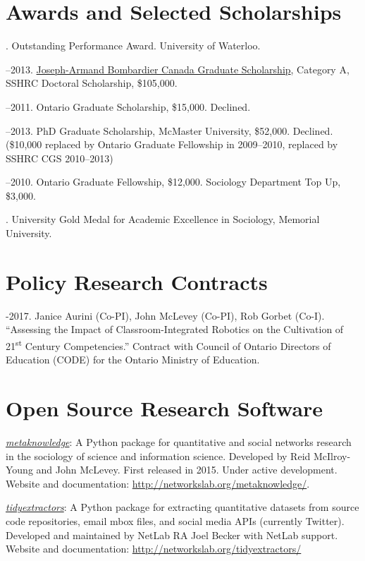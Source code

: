 \section{Awards and Selected
Scholarships}\label{awards-and-selected-scholarships}

. Outstanding Performance Award. University of Waterloo.

--2013.
\href{http://www.sshrc-crsh.gc.ca/funding-financement/programs-programmes/fellowships/doctoral-doctorat-eng.aspx}{Joseph-Armand Bombardier Canada Graduate Scholarship},
Category A, SSHRC Doctoral Scholarship, \$105,000.

--2011. Ontario Graduate Scholarship, \$15,000. Declined.

--2013. PhD Graduate Scholarship, McMaster University,
\$52,000. Declined. (\$10,000 replaced by Ontario Graduate Fellowship in
2009--2010, replaced by SSHRC CGS 2010--2013)

--2010. Ontario Graduate Fellowship, \$12,000. Sociology
Department Top Up, \$3,000.

. University Gold Medal for Academic Excellence in Sociology,
Memorial University.

\section{Policy Research Contracts}\label{policy-research-contracts}

-2017. Janice Aurini (Co-PI), John McLevey (Co-PI), Rob Gorbet
(Co-I). ``Assessing the Impact of Classroom-Integrated Robotics on the
Cultivation of 21\textsuperscript{st} Century Competencies.'' Contract
with Council of Ontario Directors of Education (CODE) for the Ontario
Ministry of Education.

\section{Open Source Research
Software}\label{open-source-research-software}

\ind \href{http://networkslab.org/metaknowledge/}{\emph{metaknowledge}}:
A Python package for quantitative and social networks research in the
sociology of science and information science. Developed by Reid
McIlroy-Young and John McLevey. First released in 2015. Under active
development. Website and documentation:
\url{http://networkslab.org/metaknowledge/}.

\ind \href{http://networkslab.org/tidyextractors/}{\emph{tidyextractors}}:
A Python package for extracting quantitative datasets from source code
repositories, email mbox files, and social media APIs (currently
Twitter). Developed and maintained by NetLab RA Joel Becker with NetLab
support. Website and documentation:
\url{http://networkslab.org/tidyextractors/}

